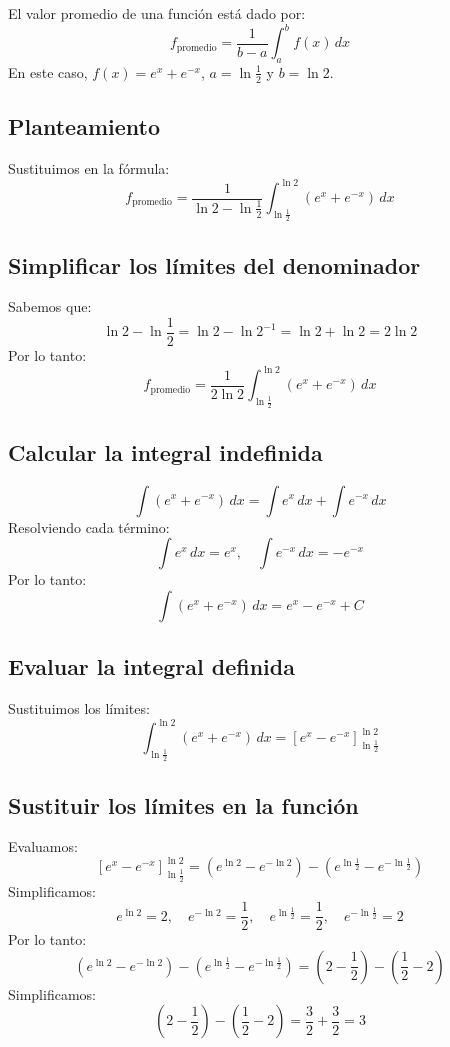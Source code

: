 El valor promedio de una función está dado por:
\[
f_{\text{promedio}} = \frac{1}{b-a} \int_{a}^{b} f(x) \, dx
\]
En este caso, \( f(x) = e^x + e^{-x} \), \( a = \ln \frac{1}{2} \) y \( b = \ln 2 \).

\subsection*{Planteamiento}
Sustituimos en la fórmula:
\[
f_{\text{promedio}} = \frac{1}{\ln 2 - \ln \frac{1}{2}} \int_{\ln \frac{1}{2}}^{\ln 2} (e^x + e^{-x}) \, dx
\]

\subsection*{Simplificar los límites del denominador}
Sabemos que:
\[
\ln 2 - \ln \frac{1}{2} = \ln 2 - \ln 2^{-1} = \ln 2 + \ln 2 = 2 \ln 2
\]
Por lo tanto:
\[
f_{\text{promedio}} = \frac{1}{2 \ln 2} \int_{\ln \frac{1}{2}}^{\ln 2} (e^x + e^{-x}) \, dx
\]

\subsection*{Calcular la integral indefinida}
\[
\int (e^x + e^{-x}) \, dx = \int e^x \, dx + \int e^{-x} \, dx
\]
Resolviendo cada término:
\[
\int e^x \, dx = e^x, \quad \int e^{-x} \, dx = -e^{-x}
\]
Por lo tanto:
\[
\int (e^x + e^{-x}) \, dx = e^x - e^{-x} + C
\]

\subsection*{Evaluar la integral definida}
Sustituimos los límites:
\[
\int_{\ln \frac{1}{2}}^{\ln 2} (e^x + e^{-x}) \, dx = \left[ e^x - e^{-x} \right]_{\ln \frac{1}{2}}^{\ln 2}
\]

\subsection*{Sustituir los límites en la función}
Evaluamos:
\[
\left[ e^x - e^{-x} \right]_{\ln \frac{1}{2}}^{\ln 2} = \left( e^{\ln 2} - e^{-\ln 2} \right) - \left( e^{\ln \frac{1}{2}} - e^{-\ln \frac{1}{2}} \right)
\]
Simplificamos:
\[
e^{\ln 2} = 2, \quad e^{-\ln 2} = \frac{1}{2}, \quad e^{\ln \frac{1}{2}} = \frac{1}{2}, \quad e^{-\ln \frac{1}{2}} = 2
\]
Por lo tanto:
\[
\left( e^{\ln 2} - e^{-\ln 2} \right) - \left( e^{\ln \frac{1}{2}} - e^{-\ln \frac{1}{2}} \right) = \left( 2 - \frac{1}{2} \right) - \left( \frac{1}{2} - 2 \right)
\]
Simplificamos:
\[
\left( 2 - \frac{1}{2} \right) - \left( \frac{1}{2} - 2 \right) = \frac{3}{2} + \frac{3}{2} = 3
\]

